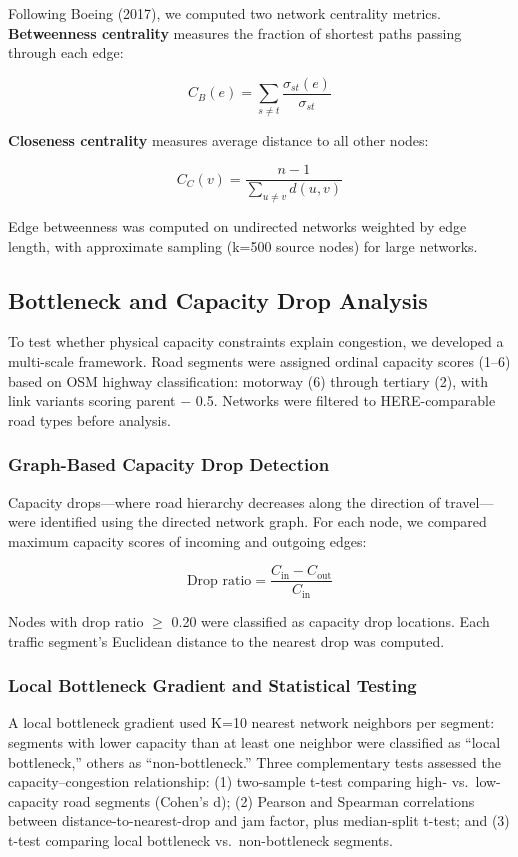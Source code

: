 \documentclass[12pt,a4paper]{article}
\begin{document}
Following Boeing (2017), we computed two network centrality metrics. \textbf{Betweenness centrality} measures the fraction of shortest paths passing through each edge:

\[C_B(e) = \sum_{s \neq t} \frac{\sigma_{st}(e)}{\sigma_{st}}\]

\textbf{Closeness centrality} measures average distance to all other nodes:

\[C_C(v) = \frac{n-1}{\sum_{u \neq v} d(u,v)}\]

Edge betweenness was computed on undirected networks weighted by edge length, with approximate sampling (k=500 source nodes) for large networks.

\subsection{Bottleneck and Capacity Drop Analysis}

To test whether physical capacity constraints explain congestion, we developed a multi-scale framework. Road segments were assigned ordinal capacity scores (1--6) based on OSM highway classification: motorway (6) through tertiary (2), with link variants scoring parent $-$ 0.5. Networks were filtered to HERE-comparable road types before analysis.

\subsubsection{Graph-Based Capacity Drop Detection}

Capacity drops---where road hierarchy decreases along the direction of travel---were identified using the directed network graph. For each node, we compared maximum capacity scores of incoming and outgoing edges:

\[\text{Drop ratio} = \frac{C_{\text{in}} - C_{\text{out}}}{C_{\text{in}}}\]

Nodes with drop ratio $\geq$ 0.20 were classified as capacity drop locations. Each traffic segment's Euclidean distance to the nearest drop was computed.

\subsubsection{Local Bottleneck Gradient and Statistical Testing}

A local bottleneck gradient used K=10 nearest network neighbors per segment: segments with lower capacity than at least one neighbor were classified as ``local bottleneck,'' others as ``non-bottleneck.'' Three complementary tests assessed the capacity--congestion relationship: (1) two-sample t-test comparing high- vs.\ low-capacity road segments (Cohen's d); (2) Pearson and Spearman correlations between distance-to-nearest-drop and jam factor, plus median-split t-test; and (3) t-test comparing local bottleneck vs.\ non-bottleneck segments.
\end{document}
